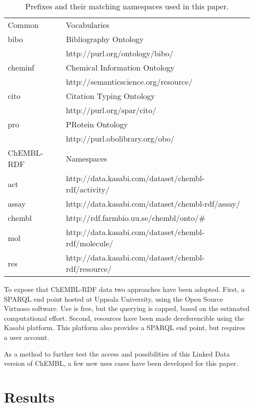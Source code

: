 \documentclass[sw]{iosart2c}
\begin{document}
\begin{table*}
\caption{Prefixes and their matching namespaces used in this paper.} \label{namespaces}
\begin{tabular}{ll}
\hline
Common & Vocabularies \\
bibo    & Bibliography Ontology~\cite{Giasson2011} \\
        & http://purl.org/ontology/bibo/ \\
cheminf & Chemical Information Ontology~\cite{Hastings2011} \\
        & http://semanticscience.org/resource/ \\
cito    & Citation Typing Ontology~\cite{Shotton2010} \\
        & http://purl.org/spar/cito/ \\
pro     & PRotein Ontology~\cite{Sidhu2006} \\
        & http://purl.obolibrary.org/obo/ \\

\hline
ChEMBL-RDF & Namespaces\\
act    & http://data.kasabi.com/dataset/chembl-rdf/activity/ \\
assay  & http://data.kasabi.com/dataset/chembl-rdf/assay/ \\
chembl & http://rdf.farmbio.uu.se/chembl/onto/\# \\
mol    & http://data.kasabi.com/dataset/chembl-rdf/molecule/ \\
res    & http://data.kasabi.com/dataset/chembl-rdf/resource/ \\
\hline
\end{tabular}
\end{table*}

To expose that ChEMBL-RDF data two approaches have been adopted. First, a SPARQL end point
hosted at Uppsala University, using the Open Source Virtuoso software. Use is free, but the
querying is capped, based on the estimated computational effort. Second, resources have
been made dereferencible using the Kasabi platform. This platform also provides a SPARQL
end point, but requires a user account.

As a method to further test the access and possibilities of this Linked Data version of
ChEMBL, a few new uses cases have been developed for this paper.

\section{Results}\label{s3}
\end{document}
